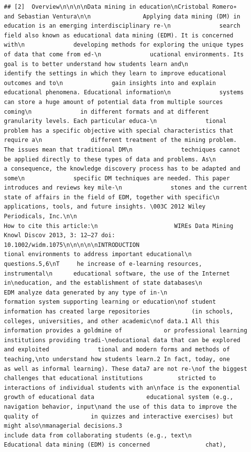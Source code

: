 \documentclass[
]{article}
\begin{document}
\begin{verbatim}
## [2]  Overview\n\n\n\nData mining in education\nCristobal Romero∗ and Sebastian Ventura\n\n               Applying data mining (DM) in education is an emerging interdisciplinary re-\n              search field also known as educational data mining (EDM). It is concerned with\n              developing methods for exploring the unique types of data that come from ed-\n              ucational environments. Its goal is to better understand how students learn and\n              identify the settings in which they learn to improve educational outcomes and to\n              gain insights into and explain educational phenomena. Educational information\n              systems can store a huge amount of potential data from multiple sources coming\n              in different formats and at different granularity levels. Each particular educa-\n              tional problem has a specific objective with special characteristics that require a\n              different treatment of the mining problem. The issues mean that traditional DM\n              techniques cannot be applied directly to these types of data and problems. As\n              a consequence, the knowledge discovery process has to be adapted and some\n              specific DM techniques are needed. This paper introduces and reviews key mile-\n              stones and the current state of affairs in the field of EDM, together with specific\n              applications, tools, and future insights. \003C 2012 Wiley Periodicals, Inc.\n\n                                                  How to cite this article:\n                      WIREs Data Mining Knowl Discov 2013, 3: 12–27 doi: 10.1002/widm.1075\n\n\n\n\nINTRODUCTION                                                     tional environments to address important educational\n                                                                 questions.5,6\nT     he increase of e-learning resources, instrumental\n      educational software, the use of the Internet in\neducation, and the establishment of state databases\n                                                                        EDM analyze data generated by any type of in-\n                                                                 formation system supporting learning or education\nof student information has created large repositories            (in schools, colleges, universities, and other academic\nof data.1 All this information provides a goldmine of            or professional learning institutions providing tradi-\neducational data that can be explored and exploited              tional and modern forms and methods of teaching,\nto understand how students learn.2 In fact, today, one           as well as informal learning). These data7 are not re-\nof the biggest challenges that educational institutions          stricted to interactions of individual students with an\nface is the exponential growth of educational data               educational system (e.g., navigation behavior, input\nand the use of this data to improve the quality of               in quizzes and interactive exercises) but might also\nmanagerial decisions.3                                           include data from collaborating students (e.g., text\n       Educational data mining (EDM) is concerned                chat), 
\end{verbatim}
\end{document}
